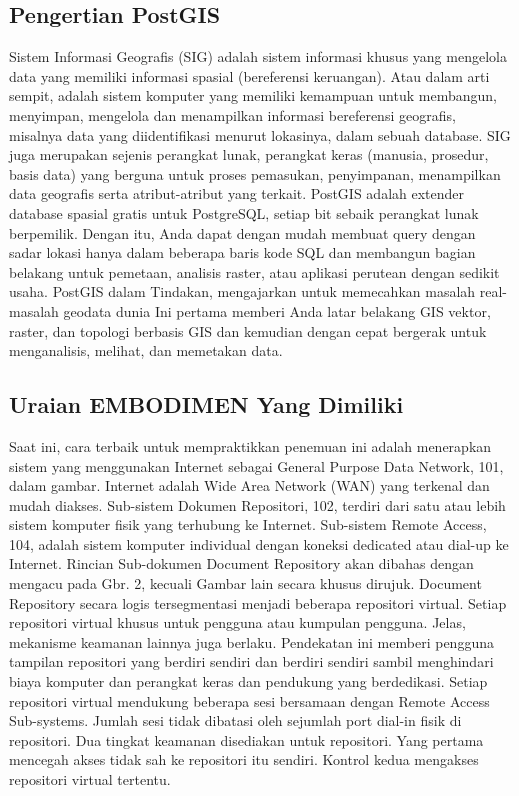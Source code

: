 \subsection{Pengertian PostGIS}
Sistem Informasi Geografis (SIG) adalah sistem informasi khusus yang mengelola data yang memiliki informasi spasial (bereferensi keruangan). 
Atau dalam arti sempit, adalah sistem komputer yang memiliki kemampuan untuk membangun,
menyimpan, mengelola dan menampilkan informasi bereferensi geografis, misalnya data yang diidentifikasi menurut lokasinya, dalam sebuah database.
SIG juga merupakan sejenis perangkat lunak, perangkat keras (manusia, prosedur, basis data) yang berguna untuk proses pemasukan, penyimpanan, menampilkan data geografis serta atribut-atribut yang terkait.
PostGIS adalah extender database spasial gratis untuk PostgreSQL, 
setiap bit sebaik perangkat lunak berpemilik. Dengan itu, 
Anda dapat dengan mudah membuat query dengan sadar lokasi hanya dalam beberapa baris kode SQL 
dan membangun bagian belakang untuk pemetaan, analisis raster, 
atau aplikasi perutean dengan sedikit usaha. 
PostGIS dalam Tindakan, mengajarkan untuk memecahkan masalah real- 
masalah geodata dunia Ini pertama memberi Anda latar belakang GIS vektor,
raster, dan topologi berbasis GIS dan kemudian dengan cepat bergerak 
untuk menganalisis, melihat, dan memetakan data.

\subsection{Uraian EMBODIMEN Yang Dimiliki}
Saat ini, cara terbaik untuk mempraktikkan penemuan ini adalah menerapkan sistem yang
menggunakan Internet sebagai General Purpose Data Network, 101, dalam gambar. 
Internet adalah Wide Area Network (WAN) yang terkenal dan mudah diakses. 
Sub-sistem Dokumen Repositori, 102, terdiri dari satu atau lebih sistem komputer fisik yang terhubung ke Internet. Sub-sistem Remote Access, 104, adalah sistem komputer individual dengan koneksi dedicated atau dial-up ke Internet.
Rincian Sub-dokumen Document Repository akan dibahas dengan mengacu pada Gbr. 2, 
kecuali Gambar lain secara khusus dirujuk. Document Repository secara logis tersegmentasi menjadi beberapa repositori virtual. 
Setiap repositori virtual khusus untuk pengguna atau kumpulan pengguna. Jelas, mekanisme keamanan lainnya juga berlaku. Pendekatan ini memberi pengguna tampilan repositori yang berdiri sendiri dan berdiri sendiri sambil menghindari biaya komputer dan perangkat keras dan pendukung yang berdedikasi. Setiap repositori virtual mendukung beberapa sesi bersamaan dengan Remote Access Sub-systems. 
Jumlah sesi tidak dibatasi oleh sejumlah port dial-in fisik di repositori. Dua tingkat keamanan disediakan untuk repositori. Yang pertama mencegah akses tidak sah ke repositori itu sendiri. Kontrol kedua mengakses repositori virtual tertentu.
